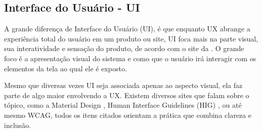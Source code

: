 

\subsection*{Interface do Usuário - UI}

A grande diferença de Interface do Usuário (UI), é que enquanto UX abrange a experiência total do usuário em um produto ou site, UI foca mais na parte visual, sua interatividade e sensação do produto, de acordo com o site da \citep{figma_ui_vs_ux}. O grande foco é a apresentação visual do sistema e como que o usuário irá interagir com os elementos da tela ao qual ele é exposto.

Mesmo que diversas vezes UI seja associada apenas ao aspecto visual, ela faz parte de algo maior envolvendo a UX. Existem diversos sites que falam sobre o tópico, como a Material Design \citep{material_design}, Human Interface Guidelines (HIG) \citep{apple_hig}, ou até mesmo WCAG, todos os itens citados orientam a prática que combina clareza e inclusão.

\label{sec:fundamentacao}




